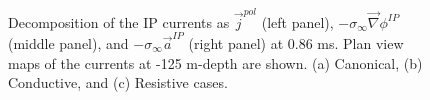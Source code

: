 \documentclass[extra,mreferee]{gji}
\newcommand{\grad}{\vec \nabla}
\newcommand{\siginf}{\sigma_\infty}
\renewcommand {\j}  { {\vec j} }
\begin{document}
\begin{figure}
  \caption{Decomposition of the IP currents as $\j^{pol}$ (left panel), $-\siginf\grad \phi^{IP}$ (middle panel), and $-\siginf\vec{a}^{IP}$ (right panel) at 0.86 ms. Plan view maps of the currents at -125 m-depth are shown. (a) Canonical, (b) Conductive, and (c) Resistive cases. }
  \label{F:IPcurrents_helmholtz_early}
\end{figure}
\end{document}

